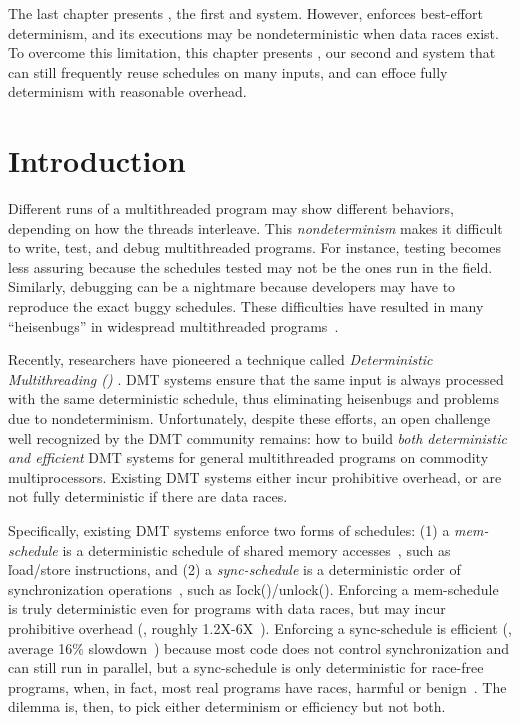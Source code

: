 The last chapter presents \tern, the first \smt and \dmt system. However, \tern
enforces best-effort determinism, and its executions may be nondeterministic
when data races exist. To overcome this limitation, this chapter presents
\peregrine, our second \smt and \dmt system that can still frequently reuse
schedules on many inputs, and can effoce fully determinism with reasonable
overhead.

\section{Introduction} \label{sec:intro}

Different runs of a multithreaded program may show different behaviors,
depending on how the threads interleave.  This \emph{nondeterminism} makes
it difficult to write, test, and debug multithreaded programs.  For
instance, testing becomes less assuring because the schedules tested may
not be the ones run in the field.  Similarly, debugging can be a nightmare
because developers may have to reproduce the exact buggy schedules.  These
difficulties have resulted in many ``heisenbugs'' in widespread
multithreaded programs~\cite{lu:concurrency-bugs}.

Recently, researchers have pioneered a technique called
\emph{Deterministic Multithreading (\dmt)} \cite{cui:tern:osdi10,dmp:asplos09,kendo:asplos09,coredet:asplos10, dos:osdi10,grace:oopsla09}.
DMT systems ensure that the same input
is always processed with the same deterministic schedule, thus eliminating
heisenbugs and problems due to nondeterminism.  Unfortunately,
despite these efforts, an open challenge~\cite{wodet11} well recognized by
the DMT community remains: how to build \emph{both deterministic
  and efficient} DMT systems for general multithreaded programs on
commodity multiprocessors.  Existing DMT systems either incur prohibitive
overhead, or are not fully deterministic if there are data races.

Specifically, existing DMT systems enforce two forms of schedules: (1) a
\emph{mem-schedule} is a deterministic schedule of shared memory
accesses~\cite{dmp:asplos09,coredet:asplos10,dos:osdi10}, such as
\v{load/store} instructions, and (2) a \emph{sync-schedule} is a
deterministic order of synchronization
operations~\cite{kendo:asplos09,cui:tern:osdi10}, such as
\v{lock()/unlock()}.  Enforcing a mem-schedule is truly deterministic even
for programs with data races, but may incur prohibitive overhead (\eg,
roughly 1.2X-6X~\cite{coredet:asplos10}).  Enforcing a sync-schedule is
efficient (\eg, average 16\% slowdown~\cite{kendo:asplos09}) because
most code does not control synchronization and can still run in
parallel, but a sync-schedule is only deterministic for race-free
programs, when, in fact, most real programs have races, harmful or
benign~\cite{lu:concurrency-bugs,syncfinder:osdi10}.  The dilemma is,
then, to pick either determinism or efficiency but not both.

